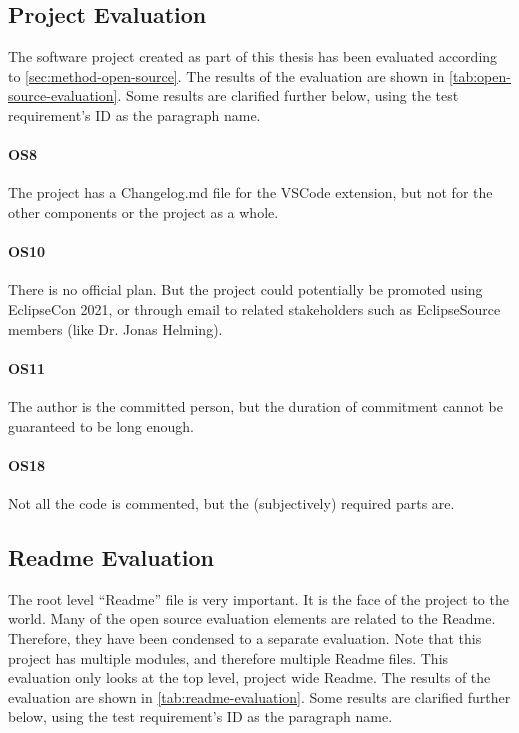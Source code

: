 
\subsection{Project Evaluation}

The software project created as part of this thesis has been evaluated according to \cref{sec:method-open-source}.
The results of the evaluation are shown in \cref{tab:open-source-evaluation}.
Some results are clarified further below, using the test requirement's ID as the paragraph name.

\paragraph{OS8} The project has a Changelog.md file for the \gls{VSCode} extension, but not for the other components or the project as a whole.

\paragraph{OS10} There is no official plan. But the project could potentially be promoted using EclipseCon 2021, or through email to related stakeholders such as EclipseSource members (like Dr. Jonas Helming).

\paragraph{OS11} The author is the committed person, but the duration of commitment cannot be guaranteed to be long enough.

\paragraph{OS18} Not all the code is commented, but the (subjectively) required parts are.



\subsection{Readme Evaluation}

The root level ``Readme'' file is very important.
It is the face of the project to the world.
Many of the \gls{open source} evaluation elements are related to the Readme.
Therefore, they have been condensed to a separate evaluation.
Note that this project has multiple modules, and therefore multiple Readme files.
This evaluation only looks at the top level, project wide Readme.
The results of the evaluation are shown in \cref{tab:readme-evaluation}.
Some results are clarified further below, using the test requirement's ID as the paragraph name.

